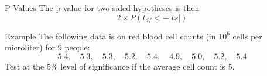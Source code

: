 \begin{frame}{P-Values}
    The p-value for two-sided hypotheses is then
    \[
        2\times P(t_{df} < -|ts|)
    \]
\end{frame}

\begin{frame}{Example}
    The following data is on red blood cell counts (in $10^6$ cells per microliter) for 9 people:
    \[
        5.4, \quad 5.3, \quad 5.3, \quad 5.2, \quad 5.4, \quad 4.9, \quad 5.0, \quad 5.2, \quad 5.4
    \]
    Test at the 5\% level of significance if the average cell count is 5.
\end{frame}
